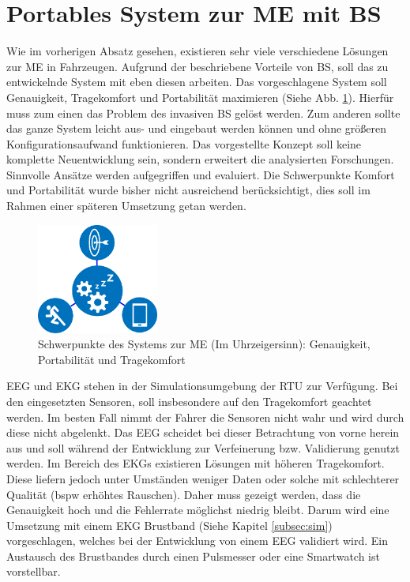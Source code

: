{\section{Portables System zur \acl{ME} mit \acl{BS}}
\label{chap:prop}
Wie im vorherigen Absatz gesehen, existieren sehr viele verschiedene Lösungen zur \acl{ME} in Fahrzeugen. Aufgrund der beschriebene Vorteile von \acl{BS}, soll das zu entwickelnde System mit eben diesen arbeiten. Das vorgeschlagene System soll Genauigkeit, Tragekomfort und Portabilität maximieren (Siehe Abb. \ref{fig:emphasis}). Hierfür muss zum einen das Problem des invasiven \acl{BS} gelöst werden. Zum anderen sollte das ganze System leicht aus- und eingebaut werden können und ohne größeren Konfigurationsaufwand funktionieren. 
Das vorgestellte Konzept soll keine komplette Neuentwicklung sein, sondern erweitert die analysierten Forschungen. Sinnvolle Ansätze werden aufgegriffen und evaluiert. Die Schwerpunkte Komfort und Portabilität wurde bisher nicht ausreichend berücksichtigt, dies soll im Rahmen einer späteren Umsetzung getan werden. \\

\begin{figure}[h] 
  \begin{center}
    \includegraphics[width=4cm]{img/all}
    \caption{Schwerpunkte des Systems zur \acl{ME} (Im Uhrzeigersinn): Genauigkeit, Portabilität und Tragekomfort}
    \label{fig:emphasis}
  \end{center}
\end{figure}

EEG und EKG stehen in der Simulationsumgebung der \acl{RTU} zur Verfügung. Bei den eingesetzten Sensoren, soll insbesondere auf den Tragekomfort geachtet werden. Im besten Fall nimmt der Fahrer die Sensoren nicht wahr und wird durch diese nicht abgelenkt. Das EEG scheidet bei dieser Betrachtung von vorne herein aus und soll während der Entwicklung zur Verfeinerung bzw. Validierung genutzt werden. Im Bereich des EKGs existieren Lösungen mit höheren Tragekomfort. Diese liefern jedoch unter Umständen weniger Daten oder solche mit schlechterer Qualität (\acl{bspw} erhöhtes Rauschen). Daher muss gezeigt werden, dass die Genauigkeit hoch und die Fehlerrate möglichst niedrig bleibt. 
Darum wird eine Umsetzung mit einem EKG Brustband (Siehe Kapitel \ref{subsec:sim}) vorgeschlagen, welches bei der Entwicklung von einem EEG validiert wird. Ein Austausch des Brustbandes durch einen Pulsmesser oder eine Smartwatch ist vorstellbar.\\

}

